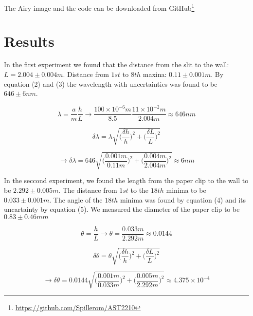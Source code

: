 \documentclass{emulateapj}
\begin{document}
The Airy image and the code can be downloaded from GitHub\footnote{\url{https://github.com/Spillerom/AST2210}}

\section{Results}
\label{sec:results}

In the first experiment we found that the distance from the slit to the wall: $L = 2.004 \pm 0.004m$. Distance from $1st$ to $8th$ maxina: $0.11 \pm 0.001m$.
By equation (2) and (3) the wavelength with uncertainties  was found to be  $646 \pm 6nm$.

\begin{equation}
\lambda = \frac{a}{m}\frac{h}{L} \rightarrow \frac{100\times 10^{-6}m}{8.5}\frac{11\times 10^{-2}m}{2.004 m} \approx 646 nm
\end{equation}

\begin{equation}
\delta \lambda = \lambda\sqrt{\bigg (\frac{\delta h}{h}\bigg)^2 + \bigg (\frac{\delta L}{L}\bigg )^2}
\end{equation}

\begin{equation}
\rightarrow \delta \lambda = 646\sqrt{\bigg (\frac{0.001m}{0.11m}\bigg)^2 + \bigg (\frac{0.004m}{2.004m}\bigg )^2} \approx 6 nm
\end{equation}

In the seccond experiment, we found the length from the paper clip to the wall to be $2.292 \pm 0.005m$. The distance from $1st$ to the $18th$ minima to be $0.033 \pm 0.001m$. The angle of the $18th$ minima was found by equation (4) and its uncartainty by equation (5). We measured the diameter of the paper clip to be $0.83 \pm 0.46mm$

\begin{equation}
\theta = \frac{h}{L} \rightarrow \theta = \frac{0.033m}{2.292m} \approx 0.0144 
\end{equation}

\begin{equation}
\delta \theta = \theta\sqrt{\bigg (\frac{\delta h}{h}\bigg)^2 + \bigg (\frac{\delta L}{L}\bigg )^2}
\end{equation}

\begin{equation}
\rightarrow \delta \theta = 0.0144\sqrt{\bigg (\frac{0.001m}{0.033m}\bigg)^2 + \bigg (\frac{0.005m}{2.292m}\bigg )^2} \approx 4.375\times 10^{-4}
\end{equation}
\end{document}
